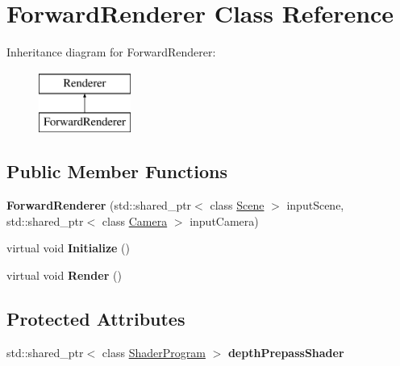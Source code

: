 \hypertarget{class_forward_renderer}{}\section{Forward\+Renderer Class Reference}
\label{class_forward_renderer}
Inheritance diagram for Forward\+Renderer\+:\begin{figure}[H]
\begin{center}
\leavevmode
\includegraphics[height=2.000000cm]{class_forward_renderer}
\end{center}
\end{figure}
\subsection*{Public Member Functions}
\begin{DoxyCompactItemize}
\item 
\hypertarget{class_forward_renderer_af8ed84e45085c4dc60d565fcc3c198d1}{}{\bfseries Forward\+Renderer} (std\+::shared\+\_\+ptr$<$ class \hyperlink{class_scene}{Scene} $>$ input\+Scene, std\+::shared\+\_\+ptr$<$ class \hyperlink{class_camera}{Camera} $>$ input\+Camera)\label{class_forward_renderer_af8ed84e45085c4dc60d565fcc3c198d1}

\item 
\hypertarget{class_forward_renderer_a99c523e11a4335d061da8bdba51f1c9a}{}virtual void {\bfseries Initialize} ()\label{class_forward_renderer_a99c523e11a4335d061da8bdba51f1c9a}

\item 
\hypertarget{class_forward_renderer_a3693c5cd68afffc14652f24fcdc62abc}{}virtual void {\bfseries Render} ()\label{class_forward_renderer_a3693c5cd68afffc14652f24fcdc62abc}

\end{DoxyCompactItemize}
\subsection*{Protected Attributes}
\begin{DoxyCompactItemize}
\item 
\hypertarget{class_forward_renderer_a8f703bc4c646416804bc82f4d220a648}{}std\+::shared\+\_\+ptr$<$ class \hyperlink{class_shader_program}{Shader\+Program} $>$ {\bfseries depth\+Prepass\+Shader}\label{class_forward_renderer_a8f703bc4c646416804bc82f4d220a648}

\end{DoxyCompactItemize}


